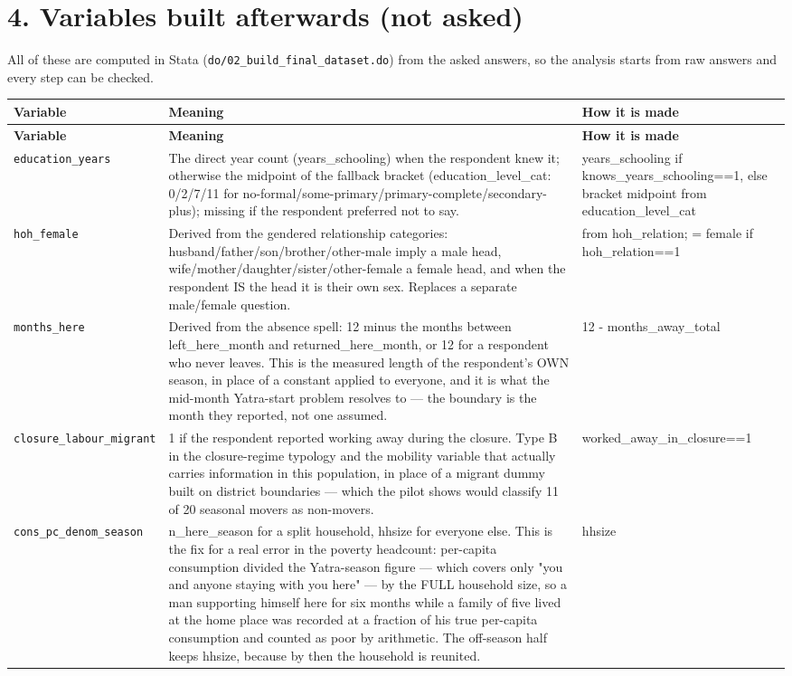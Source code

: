\documentclass[10pt]{article}
\begin{document}
\section*{4. Variables built afterwards (not asked)}
All of these are computed in Stata (\texttt{do/02\_build\_final\_dataset.do}) from the asked answers, so the analysis starts from raw answers and every step can be checked.
{\scriptsize
\begin{longtable}{p{3.3cm}p{7.6cm}p{5.7cm}}
\toprule
\textbf{Variable} & \textbf{Meaning} & \textbf{How it is made} \\
\midrule
\endfirsthead
\toprule
\textbf{Variable} & \textbf{Meaning} & \textbf{How it is made} \\
\midrule
\endhead
\texttt{education\_years} & The direct year count (years\_schooling) when the respondent knew it; otherwise the midpoint of the fallback bracket (education\_level\_cat: 0/2/7/11 for no-formal/some-primary/primary-complete/secondary-plus); missing if the respondent preferred not to say. & years\_schooling if knows\_years\_schooling==1, else bracket midpoint from education\_level\_cat \\
\texttt{hoh\_female} & Derived from the gendered relationship categories: husband/father/son/brother/other-male imply a male head, wife/mother/daughter/sister/other-female a female head, and when the respondent IS the head it is their own sex. Replaces a separate male/female question. & from hoh\_relation; = female if hoh\_relation==1 \\
\texttt{months\_here} & Derived from the absence spell: 12 minus the months between left\_here\_month and returned\_here\_month, or 12 for a respondent who never leaves. This is the measured length of the respondent's OWN season, in place of a constant applied to everyone, and it is what the mid-month Yatra-start problem resolves to — the boundary is the month they reported, not one assumed. & 12 - months\_away\_total \\
\texttt{closure\_labour\_migrant} & 1 if the respondent reported working away during the closure. Type B in the closure-regime typology and the mobility variable that actually carries information in this population, in place of a migrant dummy built on district boundaries — which the pilot shows would classify 11 of 20 seasonal movers as non-movers. & worked\_away\_in\_closure==1 \\
\texttt{cons\_pc\_denom\_season} & n\_here\_season for a split household, hhsize for everyone else. This is the fix for a real error in the poverty headcount: per-capita consumption divided the Yatra-season figure — which covers only "you and anyone staying with you here" — by the FULL household size, so a man supporting himself here for six months while a family of five lived at the home place was recorded at a fraction of his true per-capita consumption and counted as poor by arithmetic. The off-season half keeps hhsize, because by then the household is reunited. & hhsize \\

\end{longtable}}
\end{document}
